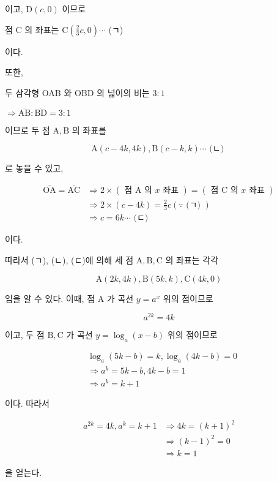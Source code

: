 \documentclass[10pt]{article}
\begin{document}
이고, \(\mathrm{D}(c, 0)\) 이므로

점 C 의 좌표는 \(\mathrm{C}\left(\frac{2}{3} c, 0\right) \cdots\) (ㄱ)

이다.

또한,

두 삼각형 OAB 와 OBD 의 넓이의 비는 \(3: 1\)

\(\Rightarrow \overline{\mathrm{AB}}: \overline{\mathrm{BD}}=3: 1\)

이므로 두 점 \(\mathrm{A}, \mathrm{B}\) 의 좌표를

\[
\mathrm{A}(c-4 k, 4 k), \mathrm{B}(c-k, k) \cdots \text { (ㄴ) }
\]

로 놓을 수 있고,

\[
\begin{aligned}
\overline{\mathrm{OA}}=\overline{\mathrm{AC}} & \Rightarrow 2 \times(\text { 점 } \mathrm{A} \text { 의 } x \text { 좌표 })=(\text { 점 } \mathrm{C} \text { 의 } x \text { 좌표 }) \\
& \Rightarrow 2 \times(c-4 k)=\frac{2}{3} c(\because \text { (ㄱ) }) \\
& \Rightarrow c=6 k \cdots \text { (ㄷ) }
\end{aligned}
\]

이다.

따라서 (ㄱ), (ㄴ), (ㄷ)에 의해 세 점 \(\mathrm{A}, \mathrm{B}, \mathrm{C}\) 의 좌표는 각각

\[
\mathrm{A}(2 k, 4 k), \mathrm{B}(5 k, k), \mathrm{C}(4 k, 0)
\]

임을 알 수 있다. 이때, 점 A 가 곡선 \(y=a^{x}\) 위의 점이므로

\[
a^{2 k}=4 k
\]

이고, 두 점 \(\mathrm{B}, \mathrm{C}\) 가 곡선 \(y=\log _{a}(x-b)\) 위의 점이므로

\[
\begin{aligned}
& \log _{a}(5 k-b)=k, \log _{a}(4 k-b)=0 \\
& \Rightarrow a^{k}=5 k-b, 4 k-b=1 \\
& \Rightarrow a^{k}=k+1
\end{aligned}
\]

이다. 따라서

\[
\begin{aligned}
a^{2 k}=4 k, a^{k}=k+1 & \Rightarrow 4 k=(k+1)^{2} \\
& \Rightarrow(k-1)^{2}=0 \\
& \Rightarrow k=1
\end{aligned}
\]

을 얻는다.
\end{document}
